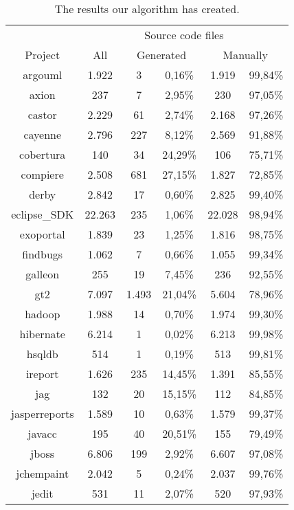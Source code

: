 \setlength{\extrarowheight}{-.15em}
\begin{table}
	\caption{The results our algorithm has created.}
	\label{table:countQualitasCorpus}
	\begin{tabularx}{\textwidth}{c|c|c|c|c|c}
		 & \multicolumn{5}{c}{Source code files}  \\
		Project & All & \multicolumn{2}{c|}{Generated} & \multicolumn{2}{c}{Manually}\\
		\hline
		argouml & 1.922 & 3 & 0,16\% & 1.919 & 99,84\% \\
		axion & 237 & 7 & 2,95\% & 230 & 97,05\% \\
		castor & 2.229 & 61 & 2,74\% & 2.168 & 97,26\% \\
		cayenne & 2.796 & 227 & 8,12\% & 2.569 & 91,88\% \\
		cobertura & 140 & 34 & 24,29\% & 106 & 75,71\% \\
		compiere & 2.508 & 681 & 27,15\% & 1.827 & 72,85\% \\
		derby & 2.842 & 17 & 0,60\% & 2.825 & 99,40\% \\
		eclipse\_SDK & 22.263 & 235 & 1,06\% & 22.028 & 98,94\% \\
		exoportal & 1.839 & 23 & 1,25\% & 1.816 & 98,75\% \\
		findbugs & 1.062 & 7 & 0,66\% & 1.055 & 99,34\% \\
		galleon & 255 & 19 & 7,45\% & 236 & 92,55\% \\
		gt2 & 7.097 & 1.493 & 21,04\% & 5.604 & 78,96\% \\
		hadoop & 1.988 & 14 & 0,70\% & 1.974 & 99,30\% \\
		hibernate & 6.214 & 1 & 0,02\% & 6.213 & 99,98\% \\
		hsqldb & 514 & 1 & 0,19\% & 513 & 99,81\% \\
		ireport & 1.626 & 235 & 14,45\% & 1.391 & 85,55\% \\
		jag & 132 & 20 & 15,15\% & 112 & 84,85\% \\
		jasperreports & 1.589 & 10 & 0,63\% & 1.579 & 99,37\% \\
		javacc & 195 & 40 & 20,51\% & 155 & 79,49\% \\
		jboss & 6.806 & 199 & 2,92\% & 6.607 & 97,08\% \\
		jchempaint & 2.042 & 5 & 0,24\% & 2.037 & 99,76\% \\
		jedit & 531 & 11 & 2,07\% & 520 & 97,93\% \\

\end{tabularx}
\end{table}
